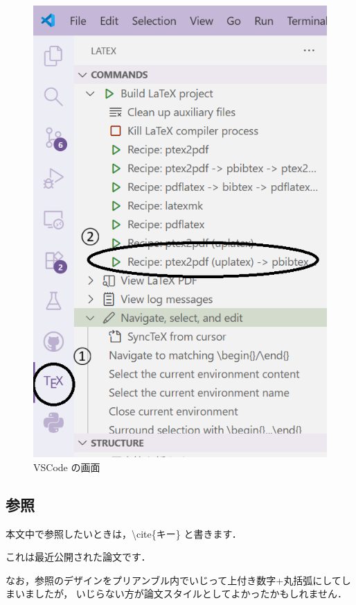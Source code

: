 \documentclass[11pt,a4j,onecolumn]{jsreport} %
\begin{document}
\begin{figure}[hbtp]
  \centering
  \includegraphics[keepaspectratio, width=60truemm]{figure/vscode.png}
  \caption{VSCode の画面}
  \label{fg:vscode}
\end{figure}

\subsection{参照}

本文中で参照したいときは，\textbackslash cite\{キー\} と書きます．

これは最近公開された論文です\cite{lee2025}．

なお，参照のデザインをプリアンブル内でいじって上付き数字+丸括弧にしてしまいましたが，
いじらない方が論文スタイルとしてよかったかもしれません．
\end{document}
